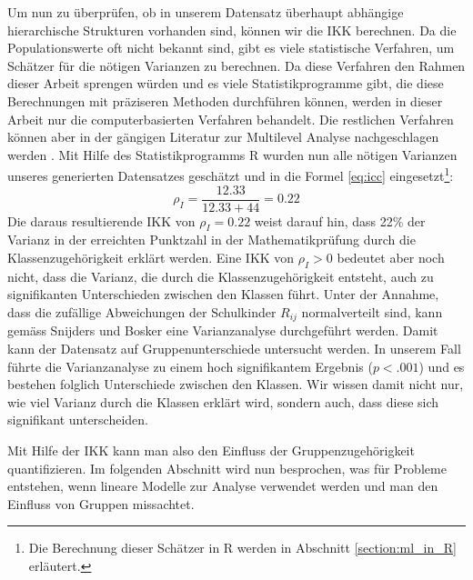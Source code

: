 \documentclass[12pt]{article}\usepackage[]{graphicx}\usepackage[]{color}
\begin{document}
Um nun zu überprüfen, ob in unserem Datensatz überhaupt abhängige hierarchische Strukturen vorhanden sind, können wir die IKK berechnen. Da die Populationswerte oft nicht bekannt sind, gibt es viele statistische Verfahren, um Schätzer für die nötigen Varianzen zu berechnen. Da diese Verfahren den Rahmen dieser Arbeit sprengen würden und es viele Statistikprogramme gibt, die diese Berechnungen mit präziseren Methoden durchführen können, werden in dieser Arbeit nur die computerbasierten Verfahren behandelt. Die restlichen Verfahren können aber in der gängigen Literatur zur Multilevel Analyse nachgeschlagen werden \citep[z.B.][]{SnijdersTomA.B2012Ma:a}. Mit Hilfe des Statistikprogramms R wurden nun alle nötigen Varianzen unseres generierten Datensatzes geschätzt und in die Formel \eqref{eq:icc} eingesetzt\footnote{Die Berechnung dieser Schätzer in R werden in Abschnitt \ref{section:ml_in_R} erläutert.}:
\begin{equation} \label{eq:icc_calc}
\rho_{I} = \dfrac{12.33}{12.33 + 44} = 0.22
\end{equation}
Die daraus resultierende IKK von $\rho_{I} = 0.22$ weist darauf hin, dass 22\% der Varianz in der erreichten Punktzahl in der Mathematikprüfung durch die Klassenzugehörigkeit erklärt werden. Eine IKK von $\rho_{I} > 0$ bedeutet aber noch nicht, dass die Varianz, die durch die Klassenzugehörigkeit entsteht, auch zu signifikanten Unterschieden zwischen den Klassen führt. Unter der Annahme, dass die zufällige Abweichungen der Schulkinder $R_{ij}$ normalverteilt sind, kann gemäss Snijders und Bosker \citeyearpar{SnijdersTomA.B2012Ma:a} eine Varianzanalyse durchgeführt werden. Damit kann der Datensatz auf Gruppenunterschiede untersucht werden. In unserem Fall führte die Varianzanalyse zu einem hoch signifikantem Ergebnis ($p<.001$) und es bestehen folglich Unterschiede zwischen den Klassen. Wir wissen damit nicht nur, wie viel Varianz durch die Klassen erklärt wird, sondern auch, dass diese sich signifikant unterscheiden. 

Mit Hilfe der IKK kann man also den Einfluss der Gruppenzugehörigkeit quantifizieren. Im folgenden Abschnitt wird nun besprochen, was für Probleme entstehen, wenn lineare Modelle zur Analyse verwendet werden und man den Einfluss von Gruppen missachtet.
\end{document}
